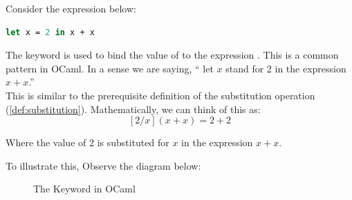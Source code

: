 \vspace{-1em}
\noindent
\begin{Def}
    
Consider the expression below:
\begin{lstlisting}[language=OCaml, numbers=none]
    let x = 2 in x + x 
\end{lstlisting}

\noindent
The  keyword is used to bind the value of  to the expression . This is a common pattern in OCaml.
In a sense we are saying, `` let $x$ stand for 2 in the expression $x + x$.''\\

This is similar to the prerequisite definition of the substitution operation (\ref{def:substitution}). Mathematically, we can think of this as:
\[
    [2/x](x + x) = 2 + 2
\]

\noindent
Where the value of 2 is substituted for $x$ in the expression $x + x$.

\end{Def}
\newpage 

\noindent
To illustrate this, Observe the diagram below:\\

\vspace{-1em}

\begin{figure}[h]
    {
    \setlength{\fboxsep}{10pt}
    \centering
    }
    \caption{The  Keyword in OCaml}
    
    \label{fig:ocaml-in}
\end{figure}



